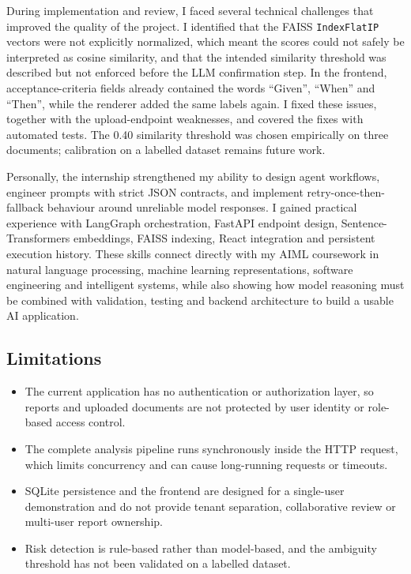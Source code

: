 \documentclass[12pt,a4paper,openany]{report}
\begin{document}
During implementation and review, I faced several technical challenges
that improved the quality of the project. I identified that the FAISS
\texttt{IndexFlatIP} vectors were not explicitly normalized, which meant
the scores could not safely be interpreted as cosine similarity, and that
the intended similarity threshold was described but not enforced before the
LLM confirmation step. In the frontend, acceptance-criteria fields already
contained the words ``Given'', ``When'' and ``Then'', while the renderer
added the same labels again. I fixed these issues, together with the
upload-endpoint weaknesses, and covered the fixes with automated tests.
The 0.40 similarity threshold was chosen empirically on three documents;
calibration on a labelled dataset remains future work.

Personally, the internship strengthened my ability to design agent
workflows, engineer prompts with strict JSON contracts, and implement
retry-once-then-fallback behaviour around unreliable model responses. I
gained practical experience with LangGraph orchestration, FastAPI endpoint
design, Sentence-Transformers embeddings, FAISS indexing, React integration
and persistent execution history. These skills connect directly with my
AIML coursework in natural language processing, machine learning
representations, software engineering and intelligent systems, while also
showing how model reasoning must be combined with validation, testing and
backend architecture to build a usable AI application.

\subsection{Limitations}
\begin{itemize}[leftmargin=*]
\item The current application has no authentication or authorization layer,
  so reports and uploaded documents are not protected by user identity or
  role-based access control.
\item The complete analysis pipeline runs synchronously inside the HTTP
  request, which limits concurrency and can cause long-running requests or
  timeouts.
\item SQLite persistence and the frontend are designed for a single-user
  demonstration and do not provide tenant separation, collaborative review
  or multi-user report ownership.
\item Risk detection is rule-based rather than model-based, and the
  ambiguity threshold has not been validated on a labelled dataset.
\end{itemize}
\end{document}
